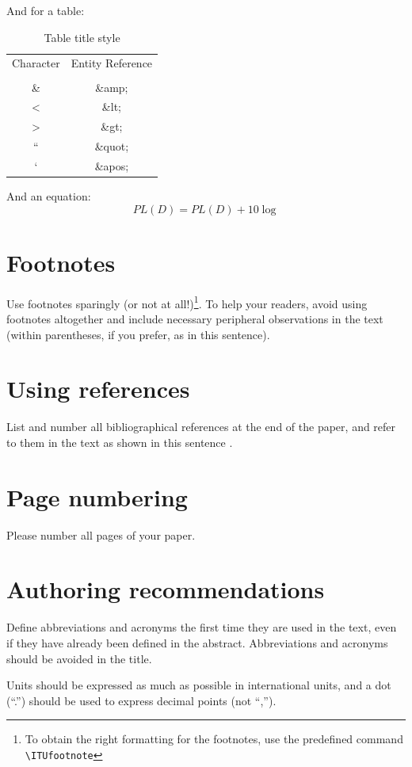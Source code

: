 \documentclass[10pt,a4paper,twocolumn]{article}
\newcommand{\ITUpar}{\vspace{8pt}\par}
\newcommand{\ITUfootnote}[1]{\footnote{#1}}
\def\starttable{\vspace{6pt}\begin{table}[ht]\center}
\begin{document}
And for a table:
\starttable
\caption{Table title style}\label{tab:tab1} 
\begin{small}
\begin{tabu}{|c|c|}
\hline
 \rowfont{\bfseries}Character & Entity Reference\\ 
  & \\
\hline
\hline
\& & \&amp; \\
\hline
 < & \&lt;\\
 \hline
 > & \&gt; \\
\hline
``  & \&quot; \\
\hline
 ` & \&apos; \\
\hline
\end{tabu}
\end{small}
\end{table}

And an equation:
\begin{equation}\label{eq:eq1}
PL(D)=PL(D)+10\log 
\end{equation}



\section{Footnotes}
\label{sec:sec7}
Use footnotes sparingly (or not at all!)\ITUfootnote{To obtain the right formatting for the footnotes, use the predefined command \texttt{\textbackslash{ITUfootnote}}}.
To help your readers, avoid using footnotes altogether and include necessary peripheral observations in the text (within parentheses, if you prefer, as in this sentence).


\section{Using references}
\label{sec:sec8}
List and number all bibliographical references at the end of the paper, and refer to them in the text as shown in this sentence \cite{bib1}.


\section{Page numbering}
\label{sec:sec9}
Please number all pages of your paper.


\section{Authoring recommendations}
\label{sec:sec10}
Define abbreviations and acronyms the first time they are used in the text, even if they have already been defined in the abstract.
Abbreviations and acronyms should be avoided in the title. \ITUpar
Units should be expressed as much as possible in international units, and a dot (``.'') should be used to express decimal points (not ``,'').
\end{document}
